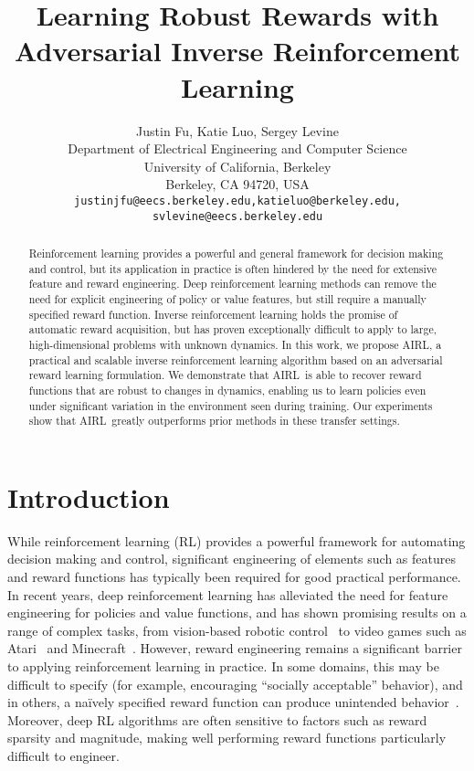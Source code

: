 \documentclass{article} \usepackage{iclr2018_conference,times}
\title{Learning Robust Rewards with Adversarial Inverse Reinforcement Learning}
\author{Justin Fu, Katie Luo, Sergey Levine  \\
Department of Electrical Engineering and Computer Science\\
University of California, Berkeley\\
Berkeley, CA 94720, USA \\
\texttt{justinjfu@eecs.berkeley.edu,katieluo@berkeley.edu,} \\
\texttt{svlevine@eecs.berkeley.edu} \\
}
\newcommand{\algnameabbrev}{AIRL}
\begin{document}
\maketitle

\begin{abstract}
Reinforcement learning provides a powerful and general framework for decision making and control, but its application in practice is often hindered by the need for extensive feature and reward engineering. Deep reinforcement learning methods can remove the need for explicit engineering of policy or value features, but still require a manually specified reward function. Inverse reinforcement learning holds the promise of automatic reward acquisition, but has proven exceptionally difficult to apply to large, high-dimensional problems with unknown dynamics. In this work, we propose \algnameabbrev, a practical and scalable inverse reinforcement learning algorithm based on an adversarial reward learning formulation. We demonstrate that \algnameabbrev\ is able to recover reward functions that are robust to changes in dynamics, enabling us to learn policies even under significant variation in the environment seen during training. Our experiments show that \algnameabbrev\ greatly outperforms prior methods in these transfer settings.
\end{abstract}

\section{Introduction}
While reinforcement learning (RL) provides a powerful framework for automating decision making and control, significant engineering of elements such as features and reward functions has typically been required for good practical performance. In recent years, deep reinforcement learning has alleviated the need for feature engineering for policies and value functions, and has shown promising results on a range of complex tasks, from vision-based robotic control~\citep{Levine16} to video games such as Atari~\citep{Mnih2015} and Minecraft~\citep{Oh16}. However, reward engineering remains a significant barrier to applying reinforcement learning in practice. In some domains, this may be difficult to specify (for example, encouraging ``socially acceptable'' behavior), and in others, a na\"{i}vely specified reward function can produce unintended behavior~\citep{Amodei16}. Moreover, deep RL algorithms are often sensitive to factors such as reward sparsity and magnitude, making well performing reward functions particularly difficult to engineer. 
\end{document}
